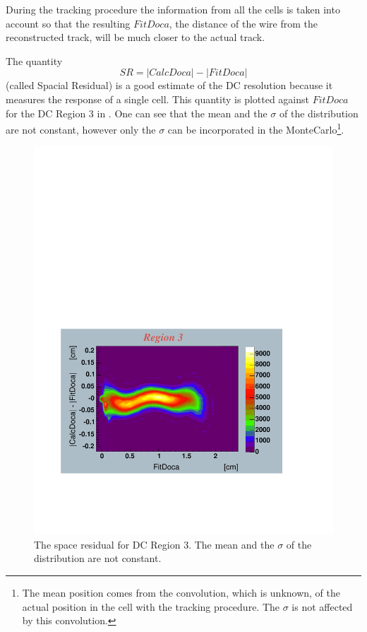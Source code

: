 During the tracking procedure the information from all the cells is taken into account so that the resulting
$FitDoca$, the distance of the wire from the reconstructed track,  will be much closer to the actual track.

The quantity 
\begin{equation}
SR = |CalcDoca| - |FitDoca|
\end{equation}
(called Spacial Residual) is a good estimate of the DC resolution because it measures
the response of a single cell.
This quantity 
is plotted against $FitDoca$ for the DC Region 3 in . One can see that 
the  mean and the $\sigma$ of the distribution are not constant, however only the $\sigma$
can be incorporated in the MonteCarlo\footnote{The mean position comes 
from the convolution, which is unknown, of the actual position in the cell with the tracking procedure.
The $\sigma$ is not affected by this convolution.}.

\begin{figure}[h]
 \begin{center}
 \includegraphics[width = 12cm, bb=50 100 600 450]{acceptance/img/re3} 
  \caption[The space residual for DC Region 3]
          { The space residual for DC Region 3. The mean and the $\sigma$ 
	             of the distribution are not constant. }
 \label{fig:dc_res}
 \end{center}
\end{figure}


